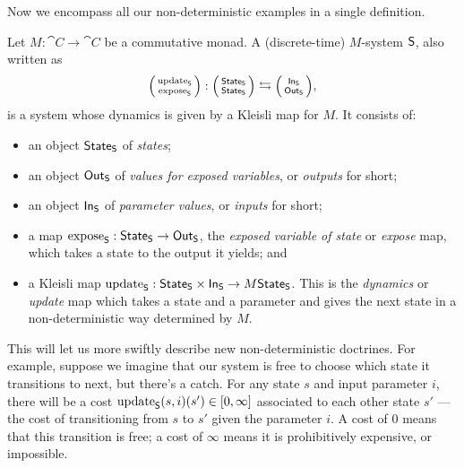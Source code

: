 \documentclass[DynamicalBook]{subfiles}
\begin{document}
Now we encompass all our non-deterministic examples in a single definition.
\begin{definition}\label{def.monadic_system}
Let $M : \cat{C} \to \cat{C}$ be a commutative monad. A (discrete-time)
$M$-system $\mathsf{S}$, also written as   
  $$\lens{\update{S}}{\expose{S}} : \lens{\State{S}}{\State{S}} \leftrightarrows \lens{\In{S}}{\Out{S}},$$ 
is a system whose dynamics is given by a Kleisli map for $M$. It consists of:
  \begin{itemize}
    \item an object $\mathsf{State}_{\mathsf{S}}$ of \emph{states};
    \item an object $\mathsf{Out}_{\mathsf{S}}$ of \emph{values for exposed variables}, or \emph{outputs}
      for short;
    \item an object $\mathsf{In}_{\mathsf{S}}$ of \emph{parameter values}, or \emph{inputs} for short;
    \item a map $\mathrm{expose}_{\mathsf{S}} : \mathsf{State}_{\mathsf{S}} \to \mathsf{Out}_{\mathsf{S}}$, the \emph{exposed variable of state} or
      \emph{expose} map, which takes a state to the output it yields; and
    \item a Kleisli map $\mathrm{update}_{\mathsf{S}} : \mathsf{State}_{\mathsf{S}} \times \mathsf{In}_{\mathsf{S}} \to
     M\mathsf{State}_{\mathsf{S}}$. This is the \emph{dynamics} or
      \emph{update} map which takes a state and a parameter and gives the
      next state in a non-deterministic way determined by $M$.
  \end{itemize}
\end{definition}

This will let us more swiftly describe new non-deterministic doctrines. For
example, suppose we imagine that our system is free to choose which state it transitions
to next, but there's a catch. For any state $s$ and input parameter $i$, there
will be a cost $\mathrm{update}_{\mathsf{S}}(s, i)(s') \in [0, \infty]$ associated to each other state $s'$ ---
the cost of transitioning from $s$ to $s'$ given the parameter $i$. A cost of
$0$ means that this transition is free; a cost of $\infty$ means it is
prohibitively expensive, or impossible.
\end{document}

